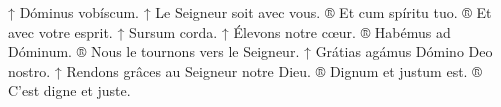 \vspace{0.3cm}

\begin{paracol}{2}
\LigneParacol{0cm}
{↑ Dóminus vobíscum.}
{↑ Le Seigneur soit avec vous.}
\LigneParacol{0cm}
{® Et cum spíritu tuo.}
{® Et avec votre esprit.}
\LigneParacol{0cm}
{↑ Sursum corda.}
{↑ Élevons notre cœur.}
\LigneParacol{0cm}
{® Habémus ad Dóminum.}
{® Nous le tournons vers le Seigneur.}
\LigneParacol{0cm}
{↑ Grátias agámus Dómino Deo nostro.}
{↑ Rendons grâces au Seigneur notre Dieu.}
\LigneParacol{0cm}
{® Dignum et justum est.}
{® C'est digne et juste.}
\end{paracol}

